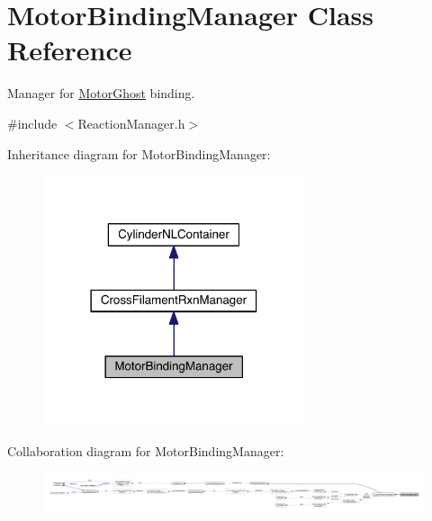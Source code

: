 \hypertarget{classMotorBindingManager}{\section{Motor\+Binding\+Manager Class Reference}
\label{classMotorBindingManager}
}


Manager for \hyperlink{classMotorGhost}{Motor\+Ghost} binding.  




{\ttfamily \#include $<$Reaction\+Manager.\+h$>$}



Inheritance diagram for Motor\+Binding\+Manager\+:
\nopagebreak
\begin{figure}[H]
\begin{center}
\leavevmode
\includegraphics[width=218pt]{classMotorBindingManager__inherit__graph}
\end{center}
\end{figure}


Collaboration diagram for Motor\+Binding\+Manager\+:
\nopagebreak
\begin{figure}[H]
\begin{center}
\leavevmode
\includegraphics[width=350pt]{classMotorBindingManager__coll__graph}
\end{center}
\end{figure}
